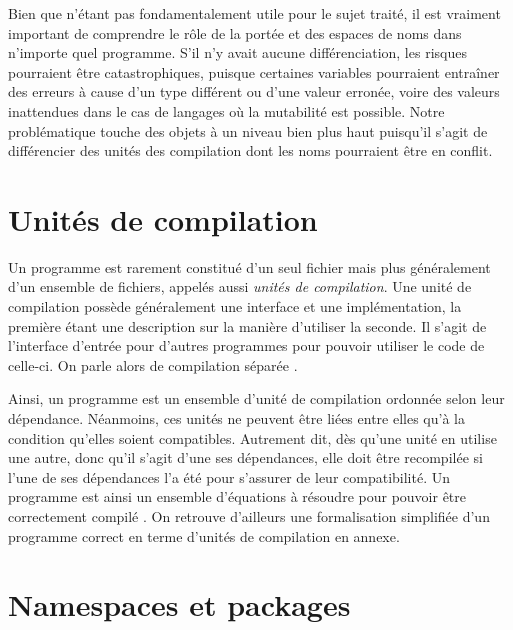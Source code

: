 \documentclass[11pt,a4paper]{report}
\begin{document}
Bien que n'étant pas fondamentalement utile pour le sujet traité, il est
vraiment important de comprendre le rôle de la portée et des espaces de noms
dans n'importe quel programme. S'il n'y avait aucune différenciation, les
risques pourraient être catastrophiques, puisque certaines variables pourraient
entraîner des erreurs à cause d'un type différent ou d'une valeur erronée, voire
des valeurs inattendues dans le cas de langages où la mutabilité est
possible. Notre problématique touche des objets à un niveau bien plus haut
puisqu'il s'agit de différencier des unités des compilation dont les noms
pourraient être en conflit.

\section{Unités de compilation}

Un programme est rarement constitué d'un seul fichier mais plus généralement
d'un ensemble de fichiers, appelés aussi \emph{unités de compilation}. Une unité
de compilation possède généralement une interface et une implémentation, la
première étant une description sur la manière d'utiliser la seconde. Il s'agit
de l'interface d'entrée pour d'autres programmes pour pouvoir utiliser le code
de celle-ci. On parle alors de compilation séparée
\cite{Cardelli97programfragments}.

Ainsi, un programme est un ensemble d'unité de compilation ordonnée selon leur
dépendance. Néanmoins, ces unités ne peuvent être liées entre elles qu'à la
condition qu'elles soient compatibles. Autrement dit, dès qu'une unité en
utilise une autre, donc qu'il s'agit d'une ses dépendances, elle doit être
recompilée si l'une de ses dépendances l'a été pour s'assurer de leur
compatibilité. Un programme est ainsi un ensemble d'équations à résoudre
pour pouvoir être correctement compilé \cite{Drossopoulou99afragment}. On
retrouve d'ailleurs une formalisation simplifiée d'un programme correct en terme
d'unités de compilation en annexe.

\section{Namespaces et packages}
\end{document}
